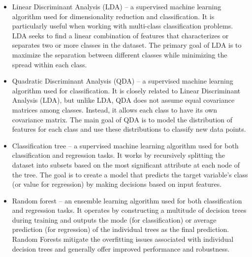 \documentclass[11pt,a4paper]{article}\usepackage[]{graphicx}\usepackage[]{xcolor}
\begin{document}
\begin{itemize}
	\item Linear Discriminant Analysis (LDA) -- a supervised machine learning algorithm used for dimensionality reduction and classification. It is particularly useful when working with multi-class classification problems. LDA seeks to find a linear combination of features that characterizes or separates two or more classes in the dataset. The primary goal of LDA is to maximize the separation between different classes while minimizing the spread within each class.
	
	\item Quadratic Discriminant Analysis (QDA) -- a supervised machine learning algorithm used for classification. It is closely related to Linear Discriminant Analysis (LDA), but unlike LDA, QDA does not assume equal covariance matrices among classes. Instead, it allows each class to have its own covariance matrix. The main goal of QDA is to model the distribution of features for each class and use these distributions to classify new data points.
	
	\item Classification tree -- a supervised machine learning algorithm used for both classification and regression tasks. It works by recursively splitting the dataset into subsets based on the most significant attribute at each node of the tree. The goal is to create a model that predicts the target variable's class (or value for regression) by making decisions based on input features.
	
	\item Random forest -- an ensemble learning algorithm used for both classification and regression tasks. It operates by constructing a multitude of decision trees during training and outputs the mode (for classification) or average prediction (for regression) of the individual trees as the final prediction. Random Forests mitigate the overfitting issues associated with individual decision trees and generally offer improved performance and robustness.
	

\end{itemize}
\end{document}
